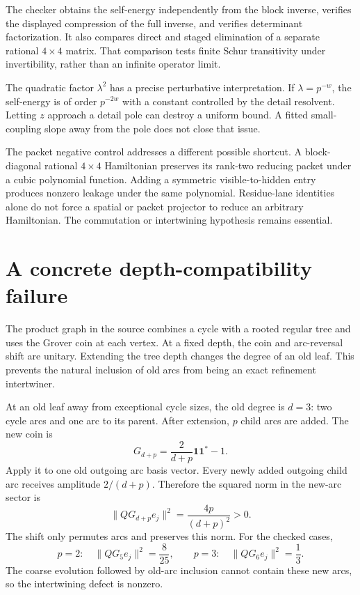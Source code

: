 The checker obtains the self-energy independently from the block inverse, verifies the displayed compression of the full inverse, and verifies determinant factorization. It also compares direct and staged elimination of a separate rational \(4\times4\) matrix. That comparison tests finite Schur transitivity under invertibility, rather than an infinite operator limit.

The quadratic factor \(\lambda^2\) has a precise perturbative interpretation. If \(\lambda=p^{-w}\), the self-energy is of order \(p^{-2w}\) with a constant controlled by the detail resolvent. Letting \(z\) approach a detail pole can destroy a uniform bound. A fitted small-coupling slope away from the pole does not close that issue.

The packet negative control addresses a different possible shortcut. A block-diagonal rational \(4\times4\) Hamiltonian preserves its rank-two reducing packet under a cubic polynomial function. Adding a symmetric visible-to-hidden entry produces nonzero leakage under the same polynomial. Residue-lane identities alone do not force a spatial or packet projector to reduce an arbitrary Hamiltonian. The commutation or intertwining hypothesis remains essential.

\clearpage
\section{A concrete depth-compatibility failure}\label{a-verify-grover}

The product graph in the source combines a cycle with a rooted regular tree and uses the Grover coin at each vertex. At a fixed depth, the coin and arc-reversal shift are unitary. Extending the tree depth changes the degree of an old leaf. This prevents the natural inclusion of old arcs from being an exact refinement intertwiner.

At an old leaf away from exceptional cycle sizes, the old degree is \(d=3\): two cycle arcs and one arc to its parent. After extension, \(p\) child arcs are added. The new coin is
\[
 G_{d+p}=\frac{2}{d+p}\mathbf1\mathbf1^*-1.
\]
Apply it to one old outgoing arc basis vector. Every newly added outgoing child arc receives amplitude \(2/(d+p)\). Therefore the squared norm in the new-arc sector is
\[
 \|QG_{d+p}e_j\|^2
 =\frac{4p}{(d+p)^2}>0.
\]
The shift only permutes arcs and preserves this norm. For the checked cases,
\[
 p=2:\quad\|QG_5e_j\|^2=\frac8{25},
 \qquad
 p=3:\quad\|QG_6e_j\|^2=\frac13.
\]
The coarse evolution followed by old-arc inclusion cannot contain these new arcs, so the intertwining defect is nonzero.

